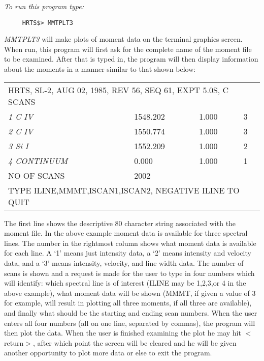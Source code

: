 {\em To run this program type:}   
\begin{verbatim}
     HRTS$> MMTPLT3                      
\end{verbatim}
  {\em MMTPLT3} will make plots of moment data on the terminal graphics
   screen.  When run, this program will first ask for the complete name of
   the moment file to be examined.  After that is typed in, the program
   will then display information about the moments in a manner similar to
   that shown below:
\begin{center}
\begin{tabular}{||l l l l l ||}
\hline 
\multicolumn{5}{||l||}{HRTS, SL-2, AUG 02, 1985, REV 56, SEQ 61, EXPT 5.0S,
C SCANS} \\
          {\em 1  C IV}  &      &      1548.202  &   1.000  &  3 \\             
          {\em 2  C IV}  &      &      1550.774  &   1.000  &  3 \\             
          {\em 3  Si I}  &      &      1552.209  &   1.000  &  2 \\             
          {\em 4  CONTINUUM} &  &      0.000     &   1.000  &  1 \\             
\multicolumn{2}{||l}{NO OF SCANS} & \multicolumn{3}{l||}{2002} \\    
\multicolumn{5}{||l||}{TYPE ILINE,MMMT,ISCAN1,ISCAN2, NEGATIVE ILINE TO QUIT} \\  
\hline
\end{tabular}
\end{center}                    
   The first line shows the descriptive 80 character string associated
   with the moment file.  In the above example moment data is available
   for three spectral lines.  The number in the rightmost column shows
   what moment data is available for each line.  A `1' means just
   intensity data, a `2' means intensity and velocity data, and a `3'
   means intensity, velocity, and line width data.  The number of scans is
   shown and a request is made for the user to type in four numbers which
   will identify:  which spectral line is of interest (ILINE may be
   1,2,3,or 4 in the above example), what moment data will be shown (MMMT,
   if given a value of 3 for example, will result in plotting all three
   moments, if all three are available), and finally what should be the
   starting and ending scan numbers. When the user enters all four numbers
  (all on one line, separated by commas), the program will then plot the
   data.  When the user is finished examining the plot he may hit 
   $<$return$>$,
   after which point the screen will be cleared and he will be given
   another opportunity to plot more data or else to exit the program.

